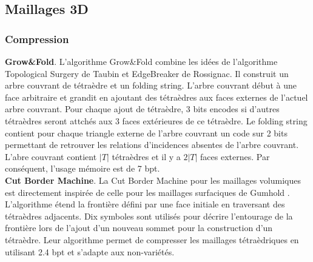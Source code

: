 \documentclass[a4paper,11pt,openany]{article}
\begin{document}
\subsection{Maillages 3D}
\subsubsection{Compression}
\noindent
\textbf{Grow\&Fold}. L'algorithme Grow\&Fold \cite{grow_and_fold} combine les idées de l'algorithme Topological Surgery \cite{topological_surgery} de Taubin et EdgeBreaker \cite{edgebreaker} de Rossignac. Il construit un arbre couvrant de tétraèdre et un folding string. L'arbre couvrant début à une face arbitraire et grandit en ajoutant des tétraèdres aux faces externes de l'actuel arbre couvrant. Pour chaque ajout de tétraèdre, 3 bits encodes si d'autres tétraèdres seront attchés aux 3 faces extérieures de ce tétraèdre. Le folding string contient pour chaque triangle externe de l'arbre couvrant un code sur 2 bits permettant de retrouver les relations d'incidences absentes de l'arbre couvrant. L'abre couvrant contient $|T|$ tétraèdres et il y a $2|T|$ faces externes. Par conséquent, l'usage mémoire est de 7 bpt.\\
\textbf{Cut Border Machine}. La Cut Border Machine pour les maillages volumiques \cite{cut_border_machine_2d} est directement inspirée de celle pour les maillages surfaciques de Gumhold \cite{cut_border_machine_3d}. L'algorithme étend la frontière défini par une face initiale en traversant des tétraèdres adjacents. Dix symboles sont utilisés pour décrire l'entourage de la frontière lors de l'ajout d'un nouveau sommet pour la construction d'un tétraèdre. Leur algorithme permet de compresser les maillages tétraèdriques en utilisant 2.4 bpt et s'adapte aux non-variétés.
 
\end{document}
